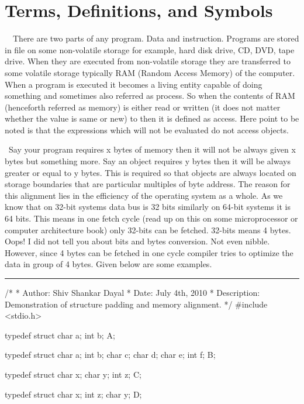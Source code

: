 \section{Terms, Definitions, and Symbols}
\startitemize[n]
\item{}\textreference[access]~~There are two parts of any
program. Data and
instruction. Programs are stored in file on some non-volatile storage for
example, hard disk drive, CD, DVD, tape drive. When they are executed
from non-volatile storage they are transferred to some volatile
storage typically RAM (Random Access Memory) of the computer. When a
program is executed it becomes a living entity capable of doing
something and sometimes also referred as process. So when the contents
of RAM (henceforth referred as memory) is either read or written (it
does not matter whether the value is same or new) to then it is
defined as access. Here point to be noted is that the expressions
which will not be evaluated do not access objects.
\item{}\textreference[alignment]~Say your program
  requires x bytes of memory then it will not be always given x bytes
  but something more. Say an object requires y bytes then it will be
  always greater or equal to y bytes. This is required so that objects
  are always located on storage boundaries that are particular
  multiples of byte address. The reason for this alignment lies in
  the efficiency of the operating system as a whole. As we know that
  on 32-bit systems data bus is 32 bits similarly on 64-bit systems
  it is 64 bits. This means in one fetch cycle (read up on this on
  some microprocessor or computer architecture book) only 32-bits
  can be fetched. 32-bits means 4 bytes. Oops! I did not tell you
  about bits and bytes conversion. Not even nibble. However, since 4
  bytes can be fetched in one cycle compiler tries to optimize the
  data in group of 4 bytes. Given below are some examples.
\blank[force,1mm]\hrule\blank[force,1mm]
\startCPP
/*
 * Author: Shiv Shankar Dayal
 * Date: July 4th, 2010
 * Description: Demonstration of structure padding and memory alignment.
 */
#include <stdio.h>

typedef struct
{
  char a;
  int b;
}A;

typedef struct
{
  char a;
  int b;
  char c;
  char d;
  char e;
  int f;
}B;

typedef struct 
{
  char x;
  char y;
  int z;
}C;

typedef struct 
{
  char x;
  int z;
  char y;
}D;

